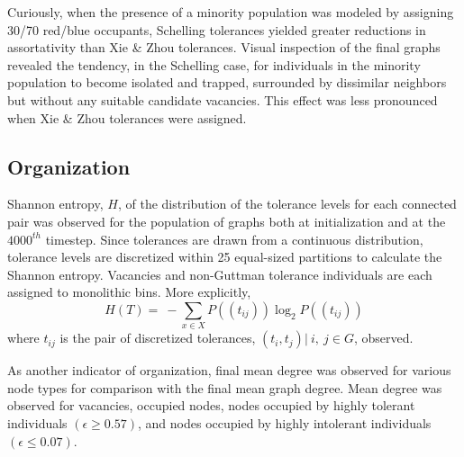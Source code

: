 \documentclass[a4paper]{article}
\begin{document}
Curiously, when the presence of a minority population was modeled by assigning 30/70 red/blue occupants, Schelling tolerances yielded greater reductions in assortativity than Xie \& Zhou tolerances. Visual inspection of the final graphs revealed the tendency, in the Schelling case, for individuals in the minority population to become isolated and trapped, surrounded by dissimilar neighbors but without any suitable candidate vacancies. This effect was less pronounced when Xie \& Zhou tolerances were assigned.

\subsection{Organization}
Shannon entropy, $H$, of the distribution of the tolerance levels for each connected pair was observed for the population of graphs both at initialization and at the $4000^{th}$ timestep. Since tolerances are drawn from a continuous distribution, tolerance levels are discretized within 25 equal-sized partitions to calculate the Shannon entropy.  Vacancies and non-Guttman tolerance individuals are each assigned to monolithic bins. More explicitly,
\begin{equation}
    H\left(T\right)=\ -\sum_{x \in X}{P\left((t_{ij})\right)\log_2{P((t_{ij}))}}
\end{equation}
where $t_{ij}$ is the pair of discretized tolerances, $\left(t_i,t_j\right)|\ i,\ j\in G$, observed.
	
As another indicator of organization, final mean degree was observed for various node types for comparison with the final mean graph degree. Mean degree was observed for vacancies, occupied nodes, nodes occupied by highly tolerant individuals $(\epsilon\geq0.57)$, and nodes occupied by highly intolerant individuals $(\epsilon\le0.07)$.
\end{document}
